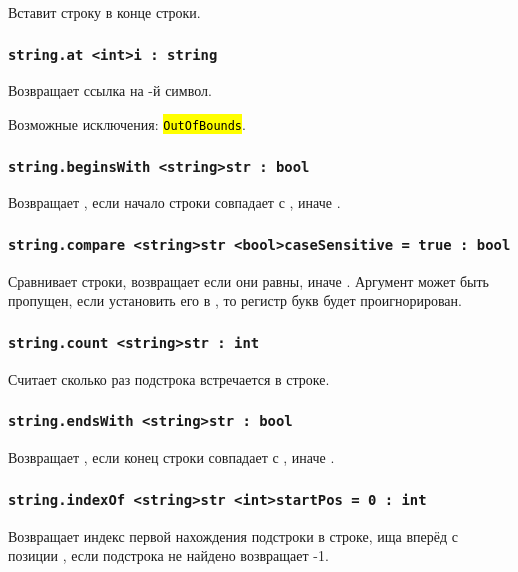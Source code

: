 \documentclass[a4paper, 14pt]{extarticle}
\newcommand{\ferror}[1]{{\fontsize{11pt}{12pt}\tt{\sethlcolor{yellow}\hl{#1}}}}
\begin{document}
Вставит строку  в конце строки.

\subsubsection{\lstinline|string.at <int>i : string|}

Возвращает ссылка на -й символ.

Возможные исключения: \ferror{OutOfBounds}.

\subsubsection{\lstinline|string.beginsWith <string>str : bool|}

Возвращает \true{}, если начало строки совпадает с , иначе \false{}.

\subsubsection{\lstinline|string.compare <string>str <bool>caseSensitive = true : bool|}

Сравнивает строки, возвращает \true{} если они равны, иначе \false{}. Аргумент  может быть пропущен, если установить его в \false{}, то регистр букв будет проигнорирован.

\subsubsection{\lstinline|string.count <string>str : int|}

Считает сколько раз подстрока  встречается в строке.

\subsubsection{\lstinline|string.endsWith <string>str : bool|}

Возвращает \true{}, если конец строки совпадает с , иначе \false{}.

\subsubsection{\lstinline|string.indexOf <string>str <int>startPos = 0 : int|}

Возвращает индекс первой нахождения подстроки  в строке, ища вперёд с позиции , если подстрока не найдено возвращает -1.
\end{document}
